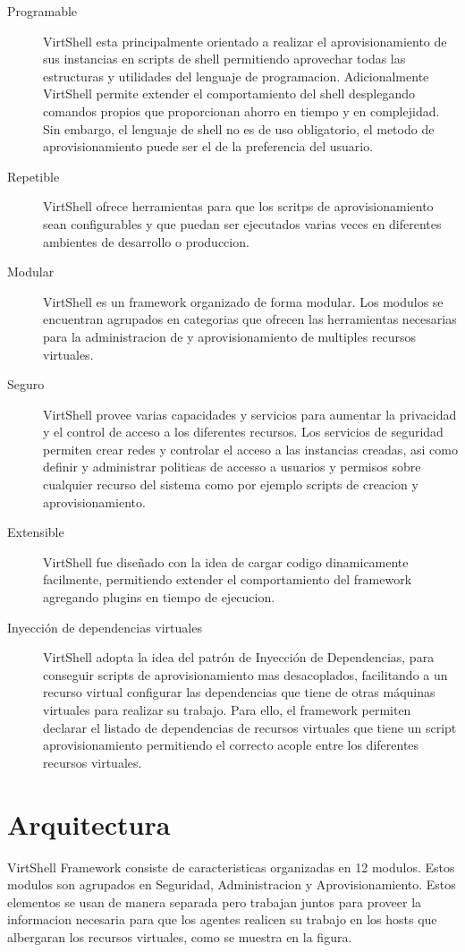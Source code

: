 \begin{description}
\item [Programable] VirtShell esta principalmente orientado a realizar el aprovisionamiento de sus instancias en scripts de shell permitiendo aprovechar todas las estructuras y utilidades del lenguaje de programacion. Adicionalmente VirtShell permite extender el comportamiento del shell desplegando comandos propios que proporcionan ahorro en tiempo y en complejidad. Sin embargo, el lenguaje de shell no es de uso obligatorio, el  metodo de aprovisionamiento puede ser el de la preferencia del usuario. 
\item [Repetible] VirtShell ofrece herramientas para que los scritps de aprovisionamiento sean configurables y que puedan ser ejecutados varias veces en diferentes ambientes de desarrollo o produccion.
\item [Modular] VirtShell es un framework organizado de forma modular. Los modulos se encuentran agrupados en categorias que ofrecen las herramientas necesarias para la administracion de y aprovisionamiento de multiples recursos virtuales.
\item [Seguro] VirtShell provee varias capacidades y servicios para aumentar la privacidad y el control de acceso a los diferentes recursos. Los servicios de seguridad permiten crear redes y controlar el acceso a las instancias creadas, asi como definir y administrar politicas de accesso a usuarios y permisos sobre cualquier recurso del sistema como por ejemplo scripts de creacion y aprovisionamiento.
\item [Extensible] VirtShell fue diseñado con la idea de cargar codigo dinamicamente facilmente, permitiendo extender el comportamiento del framework agregando plugins en tiempo de ejecucion.
\item [Inyección de dependencias virtuales] VirtShell adopta la idea del patrón de Inyección de Dependencias, para conseguir scripts de aprovisionamiento mas desacoplados, facilitando a un recurso virtual configurar las dependencias que tiene de otras máquinas virtuales para realizar su trabajo. Para ello, el framework permiten declarar el listado de dependencias de recursos virtuales que tiene un script aprovisionamiento permitiendo el correcto acople entre los diferentes recursos virtuales. 
\end{description}

\section{Arquitectura}
VirtShell Framework consiste de caracteristicas organizadas en 12 modulos. Estos modulos son agrupados en Seguridad, Administracion y Aprovisionamiento. Estos elementos se usan de manera separada pero trabajan juntos para proveer la informacion necesaria para que los agentes realicen su trabajo en los hosts que albergaran los recursos virtuales, como se muestra en la figura. \\

